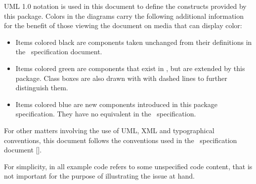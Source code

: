UML 1.0 notation is used in this document to define the constructs provided by this package. Colors 
in the diagrams carry the following additional information for the benefit of those viewing the 
document on media that can display color:

\begin{itemize}
 \item {\color{black}} Items colored black are components taken unchanged 
      from their definitions in the \SbmlLevelThreeCore\ specification document.
 \item {\color{mediumgreen}} Items colored green are components that exist in 
      \SbmlLevelThreeCore, but are extended by this package. Class boxes are also drawn with with 
      dashed lines to further distinguish them.
 \item {\color{sbmlblue}} Items colored blue are new components introduced in this 
      package specification. They have no equivalent in  the \SbmlLevelThreeCore\ specification. 
\end{itemize}
 
For other matters involving the use of UML, XML and typographical conventions, this document follows the conventions
used in the \SbmlLevelThreeCore\ specification document [\cite{ref:sbmll3v1}].

For simplicity,  in all example code refers to some unspecified code content, that is not important for the purpose of illustrating the issue at hand.
